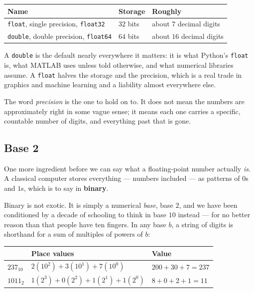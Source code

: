 \documentclass[11pt]{article}
\theoremstyle{plain}
\theoremstyle{definition}
\theoremstyle{remark}
\begin{document}
\begin{center}
\renewcommand{\arraystretch}{1.3}
\begin{tabular}{@{}l l l@{}}
\toprule
\textbf{Name} & \textbf{Storage} & \textbf{Roughly} \\
\midrule
\texttt{float}, single precision, \texttt{float32}
  & $32$ bits & about $7$ decimal digits \\
\texttt{double}, double precision, \texttt{float64}
  & $64$ bits & about $16$ decimal digits \\
\bottomrule
\end{tabular}
\end{center}

\noindent A \texttt{double} is the default nearly everywhere it matters: it is
what Python's \texttt{float} is, what MATLAB uses unless told otherwise, and
what numerical libraries assume. A \texttt{float} halves the storage and the
precision, which is a real trade in graphics and machine learning and a
liability almost everywhere else.

The word \emph{precision} is the one to hold on to. It does not mean the numbers
are approximately right in some vague sense; it means each one carries a
specific, countable number of digits, and everything past that is gone.

\subsection{Base 2}
One more ingredient before we can say what a floating-point number actually
\emph{is}. A classical computer stores everything --- numbers included --- as
patterns of $0$s and $1$s, which is to say in \textbf{binary}.

Binary is not exotic. It is simply a numerical \emph{base}, base $2$, and we
have been conditioned by a decade of schooling to think in base $10$ instead ---
for no better reason than that people have ten fingers. In any base $b$, a
string of digits is shorthand for a sum of multiples of powers of $b$:

\begin{center}
\renewcommand{\arraystretch}{1.35}
\begin{tabular}{@{}l l l@{}}
\toprule
& \textbf{Place values} & \textbf{Value} \\
\midrule
$237_{10}$  & $2(10^{2}) + 3(10^{1}) + 7(10^{0})$
            & $200+30+7 = 237$ \\
$1011_{2}$  & $1(2^{3}) + 0(2^{2}) + 1(2^{1}) + 1(2^{0})$
            & $8+0+2+1 = 11$ \\
\bottomrule
\end{tabular}
\end{center}
\end{document}
